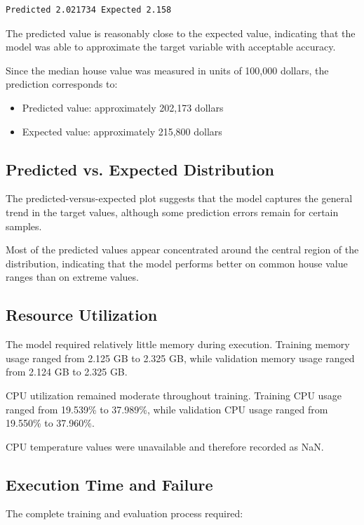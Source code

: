 \documentclass[12pt]{article}
\begin{document}
\begin{verbatim}
Predicted 2.021734 Expected 2.158
\end{verbatim}

The predicted value is reasonably close to the expected value, indicating that the model was able to approximate the target variable with acceptable accuracy.

Since the median house value was measured in units of 100,000 dollars, the prediction corresponds to:

\begin{itemize}
    \item Predicted value: approximately 202,173 dollars
    \item Expected value: approximately 215,800 dollars
\end{itemize}

\subsection{Predicted vs. Expected Distribution}

The predicted-versus-expected plot suggests that the model captures the general trend in the target values, although some prediction errors remain for certain samples.

Most of the predicted values appear concentrated around the central region of the distribution, indicating that the model performs better on common house value ranges than on extreme values.

\subsection{Resource Utilization}

The model required relatively little memory during execution. Training memory usage ranged from 2.125 GB to 2.325 GB, while validation memory usage ranged from 2.124 GB to 2.325 GB.

CPU utilization remained moderate throughout training. Training CPU usage ranged from 19.539\% to 37.989\%, while validation CPU usage ranged from 19.550\% to 37.960\%.

CPU temperature values were unavailable and therefore recorded as NaN.

\subsection{Execution Time and Failure}

The complete training and evaluation process required:
\end{document}
